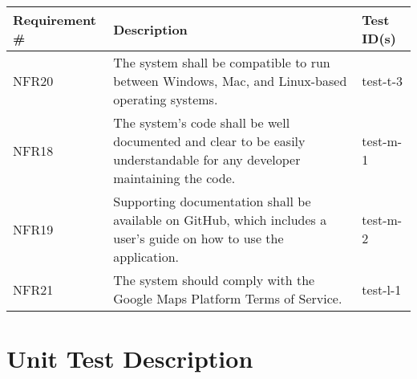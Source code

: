 \documentclass[12pt, titlepage]{article}
\begin{document}
  \newpage	
  
\begin{table}[!hbp]
	
	\begin{tabular}{|p{3.5cm}|p{6.5cm}|p{4.5cm}|}

	\hline
	\textbf{Requirement \#} & \textbf{Description}                                                                                                                                                                  & \textbf{Test ID(s)}                                                                                          \\ \hline	
	NFR20                     & The system shall be compatible to run between Windows, Mac, and Linux-based operating systems.                                                                                                       & test-t-3                                                                                          \\ \hline
	NFR18                    & The system's code shall be well documented and clear to be easily understandable for any developer maintaining the code.                                                                                                        & test-m-1                                                                                          \\ \hline
	NFR19                    & Supporting documentation shall be available on GitHub, which includes a user's guide on how to use the application.                                                                                                        & test-m-2                                                                                          \\ \hline
	NFR21                     & The system should comply with the Google Maps Platform Terms of Service.                                                                                                        & test-l-1                                                                                          \\ \hline
		\end{tabular}
	
  \end{table}

\newpage

\section{Unit Test Description}
\end{document}

